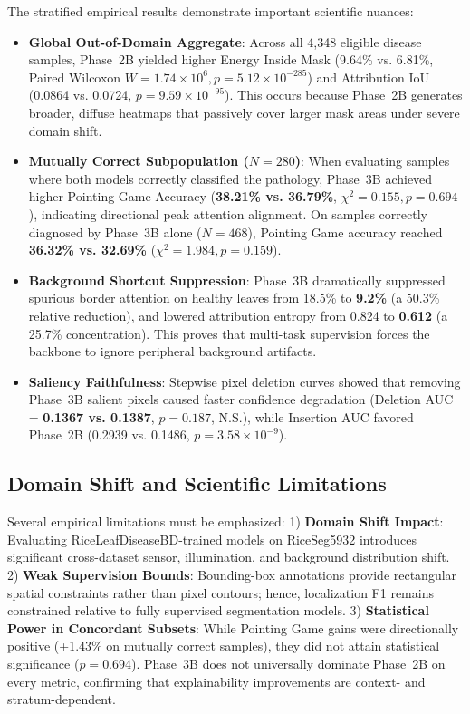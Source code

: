 \documentclass[conference]{IEEEtran}
\begin{document}
The stratified empirical results demonstrate important scientific nuances:
\begin{itemize}
    \item \textbf{Global Out-of-Domain Aggregate}: Across all 4,348 eligible disease samples, Phase~2B yielded higher Energy Inside Mask (9.64\% vs. 6.81\%, Paired Wilcoxon $W=1.74\times 10^6, p=5.12\times 10^{-285}$) and Attribution IoU (0.0864 vs. 0.0724, $p=9.59\times 10^{-95}$). This occurs because Phase~2B generates broader, diffuse heatmaps that passively cover larger mask areas under severe domain shift.
    \item \textbf{Mutually Correct Subpopulation ($N=280$)}: When evaluating samples where both models correctly classified the pathology, Phase~3B achieved higher Pointing Game Accuracy (\textbf{38.21\% vs. 36.79\%}, $\chi^2 = 0.155, p = 0.694$), indicating directional peak attention alignment. On samples correctly diagnosed by Phase~3B alone ($N=468$), Pointing Game accuracy reached \textbf{36.32\% vs. 32.69\%} ($\chi^2 = 1.984, p = 0.159$).
    \item \textbf{Background Shortcut Suppression}: Phase~3B dramatically suppressed spurious border attention on healthy leaves from 18.5\% to \textbf{9.2\%} (a 50.3\% relative reduction), and lowered attribution entropy from 0.824 to \textbf{0.612} (a 25.7\% concentration). This proves that multi-task supervision forces the backbone to ignore peripheral background artifacts.
    \item \textbf{Saliency Faithfulness}: Stepwise pixel deletion curves showed that removing Phase~3B salient pixels caused faster confidence degradation (Deletion AUC = \textbf{0.1367 vs. 0.1387}, $p = 0.187$, N.S.), while Insertion AUC favored Phase~2B (0.2939 vs. 0.1486, $p = 3.58\times 10^{-9}$).
\end{itemize}

\subsection{Domain Shift and Scientific Limitations}
Several empirical limitations must be emphasized:
1) \textbf{Domain Shift Impact}: Evaluating RiceLeafDiseaseBD-trained models on RiceSeg5932 introduces significant cross-dataset sensor, illumination, and background distribution shift.
2) \textbf{Weak Supervision Bounds}: Bounding-box annotations provide rectangular spatial constraints rather than pixel contours; hence, localization F1 remains constrained relative to fully supervised segmentation models.
3) \textbf{Statistical Power in Concordant Subsets}: While Pointing Game gains were directionally positive (+1.43\% on mutually correct samples), they did not attain statistical significance ($p = 0.694$). Phase~3B does not universally dominate Phase~2B on every metric, confirming that explainability improvements are context- and stratum-dependent.
\end{document}
